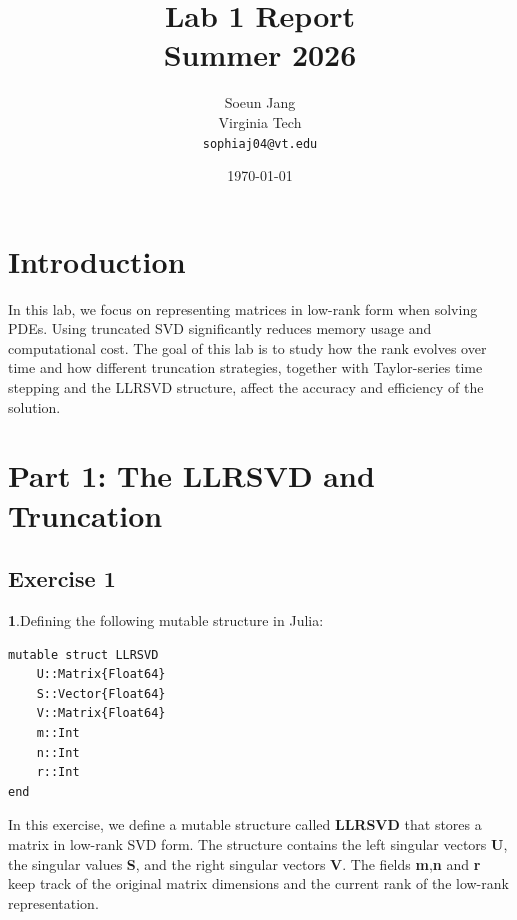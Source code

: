 \documentclass[11pt]{article}
\title{
    \vspace{-1cm}
    \textbf{Lab 1 Report}\\
    \vspace{0.2cm}
    Summer 2026
}
\author{
    Soeun Jang \\
    Virginia Tech \\
    \texttt{sophiaj04@vt.edu}
}
\date{\today}
\begin{document}
\maketitle
\newpage   

\tableofcontents
\newpage   

\section*{Introduction}

In this lab, we focus on representing matrices in low-rank form when solving PDEs. 
Using truncated SVD significantly reduces memory usage and computational cost. The goal of this lab is to study how the rank evolves over time and how different truncation strategies, together with Taylor-series time stepping and the LLRSVD structure, affect the accuracy and efficiency of the solution.


\section*{Part 1: The LLRSVD and Truncation}

\subsection*{Exercise 1}
\textbf{1}.Defining the following mutable structure in Julia:
\begin{lstlisting}
mutable struct LLRSVD
    U::Matrix{Float64}
    S::Vector{Float64}
    V::Matrix{Float64}
    m::Int
    n::Int
    r::Int
end
\end{lstlisting}

In this exercise, we define a mutable structure called \textbf{LLRSVD} that stores a matrix in low-rank SVD form. 
The structure contains the left singular vectors \textbf{U}, the singular values \textbf{S}, and the right singular vectors \textbf{V}. 
The fields \textbf{m},\textbf{n} and \textbf{r} keep track of the original matrix dimensions and the current rank of the low-rank representation.

\vspace{1.5em}
\end{document}
